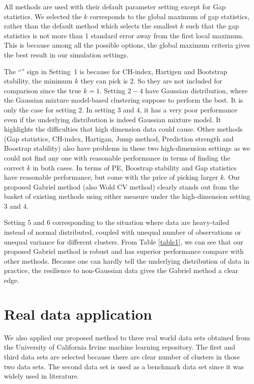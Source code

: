 \documentclass[11pt]{article}
\begin{document}
\noindent
All methods are used with their default parameter setting except for Gap
statistics. We selected the $k$  corresponds to the global maximum of gap
statistics, rather than the default method which selects the smallest $k$ such
that the gap statistics is not more than 1 standard error away from the first
local maximum. This is because among all the possible options, the global
maximum criteria gives the best result in our simulation settings.


The ``\textendash'' sign in Setting~1 is because for CH-index, Hartigen and
Bootstrap stability, the minimum $k$ they can pick is $2$. So they are not
included for comparison since the true $k=1$. Setting $2-4$ have Gaussian
distribution, where the Gaussian mixture model-based clustering suppose to
perform the best. It is only the case for setting $2$. In setting $3$ and $4$,
it has a very poor performance even if the underlying distribution is indeed
Gaussian mixture model. It highlights the difficulties that high dimension
data could cause. Other methods (Gap statistics, CH-index, Hartigan, Jump
method, Prediction strength and Boostrap stability) also have problems in
these two high-dimension settings as we could not find any one with reasonable
performance in terms of finding the correct $k$ in both cases. In terms of PE,
Boostrap stability and Gap statistics have reasonable performance, but come
with the price of picking larger $k$. Our proposed Gabriel method (also Wold
CV method) clearly stands out from the basket of existing methods using either
measure under the high-dimension setting $3$ and $4$.


Setting $5$ and $6$ corresponding to the situation where data are heavy-tailed
instead of normal distributed, coupled with unequal number of observations or
unequal variance for different clusters. From Table \ref{table1}, we can see
that our proposed Gabriel method is robust and has superior performance
compare with other methods. Because one can hardly tell the underlying
distribution of data in practice, the resilience to non-Gaussian data gives
the Gabriel method a clear edge. 



\section{Real data application}

We also applied our proposed method to three real world data sets obtained
from the University of California Irvine machine learning repository. The
first and third data sets are selected because there are clear number of
clusters in those two data sets. The second data set is used as a benchmark
data set since it was widely used in literature.
\end{document}
